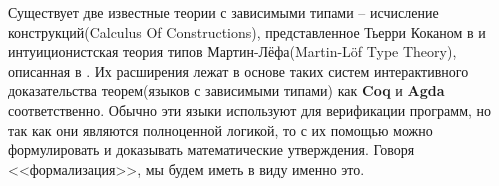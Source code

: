 Существует две известные теории с зависимыми типами -- исчисление конструкций(Calculus Of Constructions), представленное Тьерри Коканом в \cite{coquand1988calculus} и интуиционистская теория типов Мартин-Лёфа(Martin-L{\"o}f Type Theory), описанная в \cite{martin1975intuitionistic}. Их расширения лежат в основе таких систем интерактивного доказательства теорем(языков с зависимыми типами) как \textbf{Coq} и \textbf{Agda} соответственно. Обычно эти языки используют для верификации программ, но так как они являются полноценной логикой, то с их помощью можно формулировать и доказывать математические утверждения. Говоря <<формализация>>, мы будем иметь в виду именно это.
